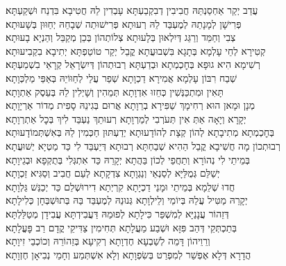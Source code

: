 {\begin{footnotesize}
\kahal
עֲדַב יְקַר אַחְסַנְתֵּהּ חֲבִיבִין דְבִקְבַעְתָּא עָבְדִין לֵהּ חֲטִיבָא בִּדְנַח וּשְׁקַעְתָּא׃\\
\shatz
פְּרִישָׁן לְמָנָתֵהּ לְמֶעְבַּד לֵהּ רְעוּתָא פְּרִישׁוּתֵה שְׁבָחֵהּ יְחַוּוּן בְּשָׁעוּתָא׃\\
\kahal
צְבִי וְחַמֵּד וְרַגֵּג דְּיִלְאוּן בְּלָעוּתָא צְלוֹתְהוֹן בְּכֵן מְקַבֵּל וְהַנְיָא בָעוּתָא׃\\
\shatz
קְטִירָא לְחֵי עָלְמָא בְּתָגָא בִּשְׁבוּעֲתָא קֳבֵל יְקַר טוֹטַפְתָּא יְתִיבָא בִקְבִיעוּתָא׃\\
\kahal
רְשִׁימָא הִיא גוּפָא בְּחׇכְמְתָא וּבְדַעְתָּא רְבוּתְהוֹן דְּיִשְׂרָאֵל קְרָאֵי בִשְׁמַעְתָּא׃\\
\shatz
שְׁבַח רִבּוֹן עָלְמָא אֲמִירָא דַכְוָתָא שְׁפַר עֲלַי לְחַוּוֹיֵהּ בְּאַפֵּי מַלְכְּוָתָא׃\\
\kahal
תָּאִין וּמִתְכַּנְּשִׁין כְּחֵזוּ אִדְוָתָא תְּמֵהִין וְשָׁיְלִין לֵהּ בְּעֵסֶק אַתְוָתָא׃\\
\shatz
מְנָן וּמָאן הוּא רְחִימָךְ שַׁפִּירָא בְרֵוָתָא אֲרוּם בְּגִינֵהּ סָפִית מְדוֹר אַרְיָוָתָא׃\\
\kahal
יְקָרָא וְיָאָה אַתְּ אִין תְּעֹרְבִי לְמַרְוָתָא רְעוּתֵךְ נַעְבֵּד לִיךְ בְּכׇל אַתְרְוָתָא׃\\
\shatz
בְּחׇכְמְתָא מְתִיבָתָא לְהוֹן קְצָת לְהוֹדָעוּתָא יְדַעְתּוּן חַכְּמִין לֵהּ בְּאִשְׁתְּמוֹדָעוּתָא׃\\
\kahal
רְבוּתְכוֹן מָה חֲשִׁיבָא קֳבֵל הַהִיא שְׁבַחְתָּא רְבוּתָא דְּיַעְבֵּד לִי כַּד מַטְיָא יְשׁוּעֲתָא׃\\
\shatz
בְּמֵיתֵי לִי נְהוֹרָא וְתַחֲפֵי לְכוֹן בַּהֲתָא יְקָרֵהּ כַּד אִתְגְּלִי בְּתֻקְפָא וּבְגֵיוָתָא׃\\
\kahal
יְשַׁלֵּם גְּמֻלַּיָּא לְסַנְאֵי וְנַגְוָתָא צִדְקָתָא לְעַם חֲבִיב וְסַגִּיא זַכְוָתָא׃\\
\shatz
חֲדוּ שְׁלֵמָא בְּמֵיתֵי וּמָנֵי דַכְיָתָא קִרְיְתָא דִירוּשְׁלֵם כַּד יְכַנֵּשׁ גַּלְוָתָא׃\\
\kahal
יְקָרֵהּ מַטִּיל עֲלַהּ בְּיוֹמֵי וְלֵילְוָתָא גְּנוּנֵהּ לְמֶעְבַּד בַּהּ בְּתוּשְׁבְּחָן כְּלִילָתָא׃\\
\shatz
דְּזֵהוֹר עֲנָנַיָּא לְמִשְׁפַּר כִּילָתָא לְפוּמֵהּ דַּעֲבִידְתָּא עֲבִידָן מְטַלַּלְתָּא׃\\
\kahal
בְּתַכְתְּקֵי דְּהַב פִּזָּא וּשְׁבַע מַעֲלָתָא תְּחִימִין צַדִּיקֵי קֳדָם רַב פׇּעֳלָתָא׃\\
\shatz
וְרֵוֵיהוֹן דָּמֵה לְשַׁבְעָא חֶדְוָתָא רְקִיעָא בְּזֵהוֹרֵהּ וְכוֹכְבֵי זִיוָתָא׃\\
\kahal
הֲדָרָא דְּלָא אֶפְשַׁר לְמִפְרַט בְּשִׂפְוָתָא וְלָא אִשְׁתְּמַע וְחָמֵי נְבִיאָן חֶזְוָתָא׃\\

\end{footnotesize}}
